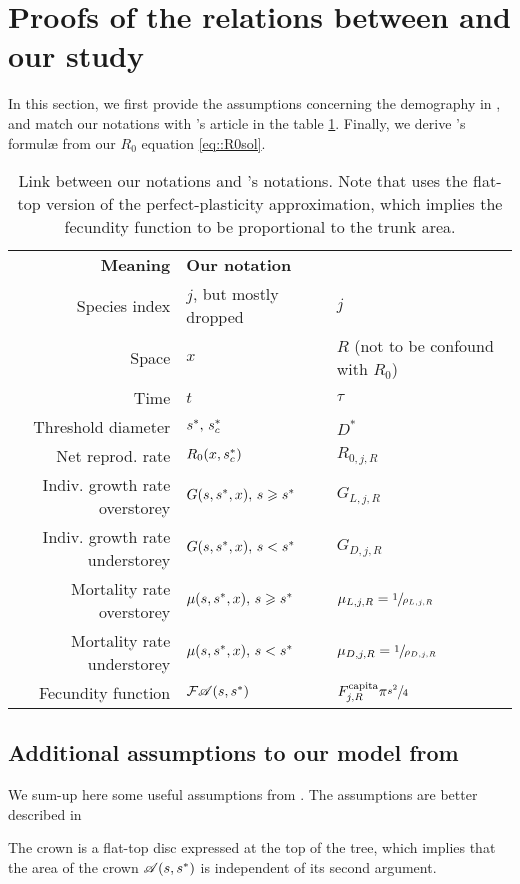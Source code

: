 \section{Proofs of the relations between \citet{Purves2009} and our study} \label{app::purves2009}
\begin{refsection}
In this section, we first provide the assumptions concerning the demography in \citet{Purves2009}, and match our notations with \citeauthor{Purves2009}'s article in the table \ref{tab::notations_purves2009}. Finally, we derive \citet{Purves2009}'s formul\ae{} from our $ R_0 $ equation \eqref{eq::R0sol}.
\begin{table}
	\centering
	\caption{Link between our notations and \citet{Purves2009}'s notations. Note that \citeauthor{Purves2009} uses the flat-top version of the perfect-plasticity approximation, which implies the fecundity function to be proportional to the trunk area.}
	\label{tab::notations_purves2009}
	\begin{tabular}{@{}rll@{}}
	\toprule
	\textbf{Meaning} & \textbf{Our notation} & \textbf{\citet{Purves2009}} \\
	Species index & $ j $, but mostly dropped & $ j $ \\
	Space & $ x $ & $ R $ (not to be confound with $ R_0 $) \\
	Time & $ t $ & $ \tau $ \\
	Threshold diameter & $ {s}^{*}, \, {s}^{*}_c $ & $ D^{*} $ \\
	Net reprod. rate & $ R_0 (x, {s}^{*}_c) $ & $ R_{0, j, R} $ \\
	Indiv. growth rate overstorey & $ G(s, {s}^{*}, x), \, s \geqslant {s}^{*} $ & $ G_{L, j, R} $ \\
	Indiv. growth rate understorey & $ G(s, {s}^{*}, x), \, s < {s}^{*} $ & $ G_{D, j, R} $ \\
	Mortality rate overstorey & $ \mu(s, {s}^{*}, x), \, s \geqslant {s}^{*} $ & $ \mu_{L, j, R} = \sfrac{1}{\rho_{L, j, R}} $ \\
	Mortality rate understorey & $ \mu(s, {s}^{*}, x), \, s < {s}^{*} $ & $ \mu_{D, j, R} = \sfrac{1}{\rho_{D, j, R}} $ \\
	Fecundity function & $ \mathcal{F} \mathscr{A}(s, {s}^{*}) $ & $ F_{j, R}^{\text{capita}} \pi \sfrac{s^2}{4} $ \\
   \bottomrule
	\end{tabular}
\end{table}

\subsection{Additional assumptions to our model from \citet{Purves2009}}
We sum-up here some useful assumptions from \citet{Purves2009}. The assumptions are better described in \citet[and yes, it is in the paper of 2008]{Purves2008}
\begin{assum} \label{assum::flat-top}
	The crown is a flat-top disc expressed at the top of the tree, which implies that the area of the crown $ \mathscr{A}(s, {s}^{*}) $ is independent of its second argument.
\end{assum}


\end{refsection}
